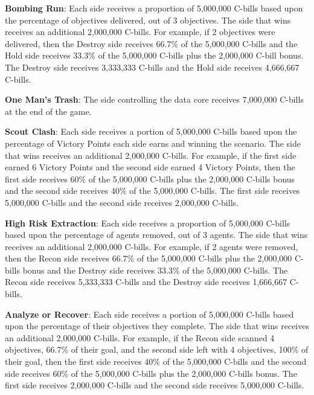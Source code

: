 \begin{description}
\item {\bfseries Bombing Run}: Each side receives a proportion of 5,000,000 C-bills based upon the percentage of objectives delivered, out of 3 objectives.
The side that wins receives an additional 2,000,000 C-bills.
For example, if 2 objectives were delivered, then the Destroy side receives 66.7\% of the 5,000,000 C-bills and the Hold side receives 33.3\% of the 5,000,000 C-bills plus the 2,000,000 C-bill bonus.
The Destroy side receives 3,333,333 C-bills and the Hold side receives 4,666,667 C-bills.

\item {\bfseries One Man's Trash}: The side controlling the data core receives 7,000,000 C-bills at the end of the game.

\item {\bfseries Scout Clash}: Each side receives a portion of 5,000,000 C-bills based upon the percentage of Victory Points each side earns and winning the scenario.
The side that wins receives an additional 2,000,000 C-bills.
For example, if the first side earned 6 Victory Points and the second side earned 4 Victory Points, then the first side receives 60\% of the 5,000,000 C-bills plus the 2,000,000 C-bills bonus and the second side receives 40\% of the 5,000,000 C-bills.
The first side receives 5,000,000 C-bills and the second side receives 2,000,000 C-bills.

\item {\bfseries High Risk Extraction}: Each side receives a proportion of 5,000,000 C-bills based upon the percentage of agents removed, out of 3 agents.
The side that wins receives an additional 2,000,000 C-bills.
For example, if 2 agents were removed, then the Recon side receives 66.7\% of the 5,000,000 C-bills plus the 2,000,000 C-bills bonus and the Destroy side receives 33.3\% of the 5,000,000 C-bills.
The Recon side receives 5,333,333 C-bills and the Destroy side receives 1,666,667 C-bills.

\item {\bfseries Analyze or Recover}: Each side receives a portion of 5,000,000 C-bills based upon the percentage of their objectives they complete.
The side that wins receives an additional 2,000,000 C-bills.
For example, if the Recon side scanned 4 objectives, 66.7\% of their goal, and the second side left with 4 objectives, 100\% of their goal, then the first side receives 40\% of the 5,000,000 C-bills and the second side receives 60\% of the 5,000,000 C-bills plus the 2,000,000 C-bills bonus.
The first side receives 2,000,000 C-bills and the second side receives 5,000,000 C-bills.


\end{description}
